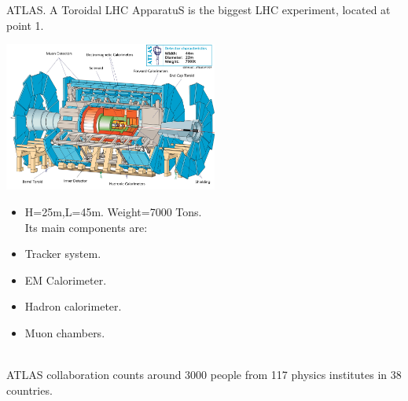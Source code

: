\documentclass[8pt]{beamer}
\begin{document}
\begin{frame}[fragile]{ATLAS.}
	A Toroidal LHC ApparatuS is the biggest LHC experiment, located at point 1.
	\vspace{0.5cm}
	\\
	\begin{minipage}{0.7\textwidth}%
		\includegraphics[width=7cm]{7}
	\end{minipage}%
	\hfill%
	\begin{minipage}{0.3\textwidth}\raggedleft
		\begin{itemize}
			\item H=25m,L=45m. Weight=7000 Tons.
			\\
			\vspace{0.5cm}
			Its main components are:	
			\item Tracker system.
			\item EM Calorimeter.
			\item Hadron calorimeter.
			\item Muon chambers.
		\end{itemize}
	\end{minipage}
	\\
	\vspace{0.5cm}
	ATLAS collaboration counts around 3000 people from 117 physics institutes in 38 countries.
\end{frame}

\end{document}
